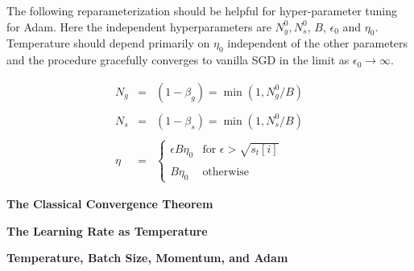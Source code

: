 {

{\huge
The following reparameterization should be helpful for hyper-parameter tuning for Adam.  Here the independent
hyperparameters are $N^0_g, N^0_s$, $B$, $\epsilon_0$ and $\eta_0$.  Temperature should depend primarily on $\eta_0$ independent of
the other parameters and the procedure gracefully converges to vanilla SGD in the limit as $\epsilon_0 \rightarrow \infty$.

\begin{eqnarray*}
N_g & = & (1-\beta_g) = \min(1,N^0_g/B) \\
\\
N_s & = & (1-\beta_s) = \min(1,N^0_s/B) \\
\\
\eta & = & \left\{\begin{array}{ll} \epsilon B \eta_0 & \mbox{for $\epsilon > \sqrt{s_t[i]}$} \\ \\
     B \eta_0 & \mbox{otherwise} \end{array} \right.
\end{eqnarray*}
}

  \centerline{\bf The Classical Convergence Theorem}
  \vfill
  \centerline{\bf The Learning Rate as Temperature}
  \vfill
  \centerline{\bf Temperature, Batch Size, Momentum, and Adam}


} 

